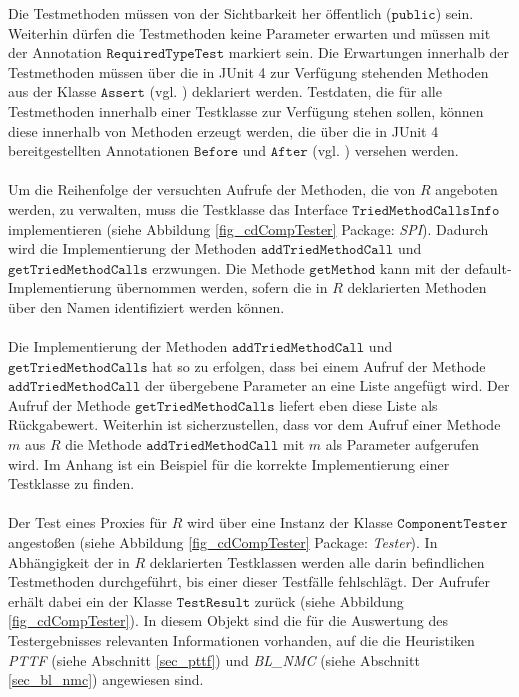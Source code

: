 {{Die Testmethoden müssen von der Sichtbarkeit her öffentlich ($\texttt{public}$) sein. Weiterhin dürfen die Testmethoden keine Parameter erwarten und müssen mit der Annotation $\texttt{RequiredTypeTest}$ markiert sein. Die Erwartungen innerhalb der Testmethoden müssen über die in JUnit 4 zur Verfügung stehenden Methoden aus der Klasse $\texttt{Assert}$ (vgl. \cite{junit_api}) deklariert werden. Testdaten, die für alle Testmethoden innerhalb einer Testklasse zur Verfügung stehen sollen, können diese innerhalb von Methoden erzeugt werden, die über die in JUnit 4 bereitgestellten Annotationen $\texttt{Before}$ und $\texttt{After}$ (vgl. \cite{junit_api}) versehen werden.
\\\\
Um die Reihenfolge der versuchten Aufrufe der Methoden, die von $R$ angeboten werden, zu verwalten, muss die Testklasse das Interface $\texttt{TriedMethodCallsInfo}$ implementieren (siehe Abbildung \ref{fig_cdCompTester} Package: \emph{SPI}). Dadurch wird die Implementierung der Methoden $\texttt{addTriedMethodCall}$ und $\texttt{getTriedMethodCalls}$ erzwungen. Die Methode $\texttt{getMethod}$ kann mit der default-Implementierung übernommen werden, sofern die in $R$ deklarierten Methoden über den Namen identifiziert werden können.
\\\\
Die Implementierung der Methoden $\texttt{addTriedMethodCall}$ und $\texttt{getTriedMethodCalls}$ hat so zu erfolgen, dass bei einem Aufruf der Methode $\texttt{addTriedMethodCall}$ der übergebene Parameter an eine Liste angefügt wird. Der Aufruf der Methode $\texttt{getTriedMethodCalls}$ liefert eben diese Liste als Rückgabewert. Weiterhin ist sicherzustellen, dass vor dem Aufruf einer Methode $m$ aus $R$ die Methode $\texttt{addTriedMethodCall}$ mit $m$ als Parameter aufgerufen wird. Im Anhang ist ein Beispiel für die korrekte Implementierung einer Testklasse zu finden.
\\\\
Der Test eines Proxies für $R$ wird über eine Instanz der Klasse $\texttt{ComponentTester}$ angestoßen (siehe Abbildung \ref{fig_cdCompTester} Package: \emph{Tester}). In Abhängigkeit der in $R$ deklarierten Testklassen werden alle darin befindlichen Testmethoden durchgeführt, bis einer dieser Testfälle fehlschlägt. Der Aufrufer erhält dabei ein der Klasse $\texttt{TestResult}$ zurück (siehe Abbildung \ref{fig_cdCompTester}). In diesem Objekt sind die für die Auswertung des Testergebnisses relevanten Informationen vorhanden, auf die die Heuristiken \emph{PTTF} (siehe Abschnitt \ref{sec_pttf}) und \emph{BL\_NMC} (siehe Abschnitt \ref{sec_bl_nmc}) angewiesen sind.
}}
